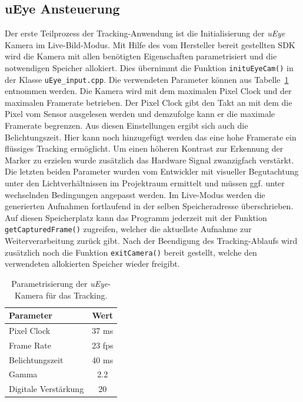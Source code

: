 \subsection{uEye Ansteuerung}\label{sec:UEyeSteu}%
Der erste Teilprozess der Tracking-Anwendung ist die Initialisierung der \textit{uEye} Kamera im Live-Bild-Modus. Mit Hilfe des vom Hersteller bereit gestellten SDK wird die Kamera mit allen benötigten Eigenschaften parametrisiert und die notwendigen Speicher allokiert. Dies übernimmt die Funktion \texttt{init\-uEyeCam()} in der Klasse \texttt{uEye\_input.cpp}. Die verwendeten Parameter können aus Tabelle~\ref{tab:UeyeParam} entnommen werden. Die Kamera wird mit dem maximalen Pixel Clock und der maximalen Framerate betrieben. Der Pixel Clock gibt den Takt an mit dem die Pixel vom Sensor ausgelesen werden und demzufolge kann er die maximale Framerate begrenzen. Aus diesen Einstellungen ergibt sich auch die Belichtungszeit.
Hier kann noch hinzugefügt werden das eine hohe Framerate ein flüssiges Tracking ermöglicht.
Um einen höheren Kontrast zur Erkennung der Marker zu erzielen wurde zusätzlich das Hardware Signal zwanzigfach verstärkt. Die letzten beiden Parameter wurden vom Entwickler mit visueller Begutachtung unter den Lichtverhältnissen im Projektraum ermittelt und müssen ggf. unter wechselnden Bedingungen angepasst werden.  
Im Live-Modus werden die generierten Aufnahmen fortlaufend in der selben Speicheradresse überschrieben. Auf diesen Speicherplatz kann das Programm jederzeit mit der Funktion \texttt{get\-Captured\-Frame()} zugreifen, welcher die aktuellste Aufnahme zur Weiterverarbeitung zurück gibt. Nach der Beendigung des Tracking-Ablaufs wird zusätzlich noch die Funktion \texttt{exit\-Camera()} bereit gestellt, welche den verwendeten allokierten Speicher wieder freigibt.

\begin{table}
	\centering
	\begin{tabular}{|l|c|}
		\hline
		\Absatzbox{}
		\textbf{Parameter}& \textbf{Wert} \\
		\hline
		Pixel Clock & 37 ms \\
		\hline
		Frame Rate & 23 fps \\
		\hline 
		Belichtungszeit & 40 ms\\
		\hline
		Gamma & 2.2 \\
		\hline
		Digitale Verstärkung & 20 \\
		\hline
	\end{tabular}
	\caption[Parametrisierung der \textit{uEye}-Kamera für das Tracking]{Parametrisierung der \textit{uEye}-Kamera für das Tracking.}
	\label{tab:UeyeParam}
\end{table}

